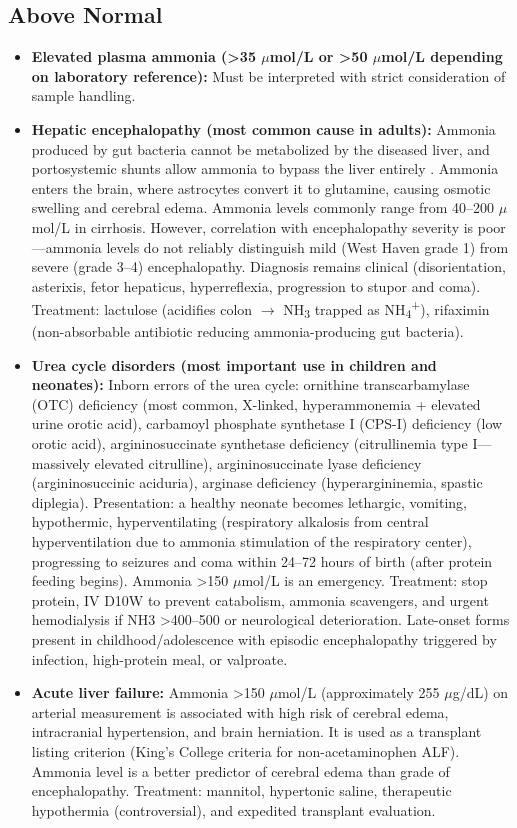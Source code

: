 \subsection*{Above Normal}
\begin{itemize}
  \item \textbf{Elevated plasma ammonia (>35 $\mu$mol/L or >50 $\mu$mol/L depending on laboratory reference):} Must be interpreted with strict consideration of sample handling.
  \item \textbf{Hepatic encephalopathy (most common cause in adults):} Ammonia produced by gut bacteria cannot be metabolized by the diseased liver, and portosystemic shunts allow ammonia to bypass the liver entirely \cite{vilstrup2014hepatic}. Ammonia enters the brain, where astrocytes convert it to glutamine, causing osmotic swelling and cerebral edema. Ammonia levels commonly range from 40--200 $\mu$mol/L in cirrhosis. However, correlation with encephalopathy severity is poor---ammonia levels do not reliably distinguish mild (West Haven grade 1) from severe (grade 3--4) encephalopathy. Diagnosis remains clinical (disorientation, asterixis, fetor hepaticus, hyperreflexia, progression to stupor and coma). Treatment: lactulose (acidifies colon $\rightarrow$ NH\textsubscript{3} trapped as NH\textsubscript{4}\textsuperscript{+}), rifaximin (non-absorbable antibiotic reducing ammonia-producing gut bacteria).
  \item \textbf{Urea cycle disorders (most important use in children and neonates):} Inborn errors of the urea cycle: ornithine transcarbamylase (OTC) deficiency (most common, X-linked, hyperammonemia + elevated urine orotic acid), carbamoyl phosphate synthetase I (CPS-I) deficiency (low orotic acid), argininosuccinate synthetase deficiency (citrullinemia type I---massively elevated citrulline), argininosuccinate lyase deficiency (argininosuccinic aciduria), arginase deficiency (hyperargininemia, spastic diplegia). Presentation: a healthy neonate becomes lethargic, vomiting, hypothermic, hyperventilating (respiratory alkalosis from central hyperventilation due to ammonia stimulation of the respiratory center), progressing to seizures and coma within 24--72 hours of birth (after protein feeding begins). Ammonia >150 $\mu$mol/L is an emergency. Treatment: stop protein, IV D10W to prevent catabolism, ammonia scavengers, and urgent hemodialysis if NH3 >400--500 or neurological deterioration. Late-onset forms present in childhood/adolescence with episodic encephalopathy triggered by infection, high-protein meal, or valproate.
  \item \textbf{Acute liver failure:} Ammonia >150 $\mu$mol/L (approximately 255 $\mu$g/dL) on arterial measurement is associated with high risk of cerebral edema, intracranial hypertension, and brain herniation. It is used as a transplant listing criterion (King's College criteria for non-acetaminophen ALF). Ammonia level is a better predictor of cerebral edema than grade of encephalopathy. Treatment: mannitol, hypertonic saline, therapeutic hypothermia (controversial), and expedited transplant evaluation.

\end{itemize}
